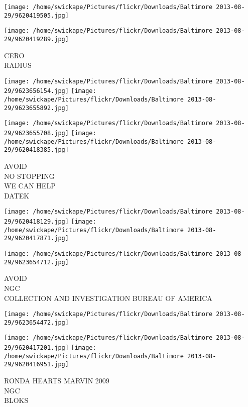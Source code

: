 \documentclass[10pt,letterpaper]{article}
\begin{document}
\texttt{[image: /home/swickape/Pictures/flickr/Downloads/Baltimore 2013-08-29/9620419505.jpg]}

\vspace{0.25in}
\texttt{[image: /home/swickape/Pictures/flickr/Downloads/Baltimore 2013-08-29/9620419289.jpg]}

CERO\\
RADIUS\\
\pagebreak

\texttt{[image: /home/swickape/Pictures/flickr/Downloads/Baltimore 2013-08-29/9623656154.jpg]}
\texttt{[image: /home/swickape/Pictures/flickr/Downloads/Baltimore 2013-08-29/9623655892.jpg]}

\texttt{[image: /home/swickape/Pictures/flickr/Downloads/Baltimore 2013-08-29/9623655708.jpg]}
\texttt{[image: /home/swickape/Pictures/flickr/Downloads/Baltimore 2013-08-29/9620418385.jpg]}

AVOID\\
NO STOPPING\\
WE CAN HELP\\
DATEK\\
\pagebreak

\texttt{[image: /home/swickape/Pictures/flickr/Downloads/Baltimore 2013-08-29/9620418129.jpg]}
\texttt{[image: /home/swickape/Pictures/flickr/Downloads/Baltimore 2013-08-29/9620417871.jpg]}

\vspace{0.25in}
\texttt{[image: /home/swickape/Pictures/flickr/Downloads/Baltimore 2013-08-29/9623654712.jpg]}

AVOID\\
NGC\\
COLLECTION AND INVESTIGATION BUREAU OF AMERICA\\
\pagebreak

\texttt{[image: /home/swickape/Pictures/flickr/Downloads/Baltimore 2013-08-29/9623654472.jpg]}

\vspace{0.25in}
\texttt{[image: /home/swickape/Pictures/flickr/Downloads/Baltimore 2013-08-29/9620417201.jpg]}
\texttt{[image: /home/swickape/Pictures/flickr/Downloads/Baltimore 2013-08-29/9620416951.jpg]}

RONDA HEARTS MARVIN 2009\\
NGC\\
BLOKS\\
\pagebreak
\end{document}
